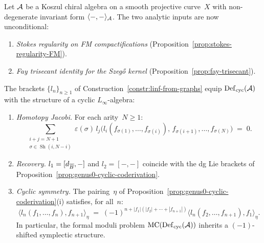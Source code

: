 \begin{theorem}\label{thm:cyclic-linf-graph}
Let $\mathcal{A}$ be a Koszul chiral algebra on a smooth projective
curve~$X$ with non-degenerate invariant form
$\langle{-},{-}\rangle_{\mathcal{A}}$.
The two analytic inputs are now unconditional:
\begin{enumerate}[label=\textup{(H\arabic*)}]
\item\label{hyp:stokes-FM}
  \emph{Stokes regularity on FM compactifications}
  \textup{(}Proposition~\textup{\ref{prop:stokes-regularity-FM}}\textup{)}.
\item\label{hyp:fay-propagator}
  \emph{Fay trisecant identity for the Szeg\H{o} kernel}
  \textup{(}Proposition~\textup{\ref{prop:fay-trisecant}}\textup{)}.
\end{enumerate}
The brackets $\{l_n\}_{n \geq 1}$ of
Construction~\textup{\ref{constr:linf-from-graphs}} equip
$\operatorname{Def}_{\mathrm{cyc}}(\mathcal{A})$ with the structure of a cyclic $L_\infty$-algebra:
\begin{enumerate}[label=\textup{(\alph*)}]
\item \emph{Homotopy Jacobi.}
  For each arity~$N \geq 1$:
  \begin{equation}\label{eq:homotopy-jacobi-graph}
  \sum_{\substack{i + j = N + 1 \\
  \sigma \in \operatorname{Sh}(i,N-i)}}
  \varepsilon(\sigma)\,
  l_j\bigl(l_i(f_{\sigma(1)}, \ldots, f_{\sigma(i)}),\,
  f_{\sigma(i+1)}, \ldots, f_{\sigma(N)}\bigr) \;=\; 0.
  \end{equation}
\item \emph{Recovery.}
  $l_1 = [d_{\overline{B}}, -]$ and
  $l_2 = [-,-]$ coincide with the dg Lie brackets of
  Proposition~\textup{\ref{prop:genus0-cyclic-coderivation}}.
\item \emph{Cyclic symmetry.}
  The pairing~$\eta$ of
  Proposition~\textup{\ref{prop:genus0-cyclic-coderivation}(i)}
  satisfies, for all~$n$:
  \begin{equation}\label{eq:cyclic-symmetry-graph}
  \langle l_n(f_1, \ldots, f_n), f_{n+1}\rangle_\eta
  \;=\;
  (-1)^{n + |f_1|(|f_2|+\cdots+|f_{n+1}|)}
  \langle l_n(f_2, \ldots, f_{n+1}), f_1\rangle_\eta.
  \end{equation}
  In particular, the formal moduli problem
  $\operatorname{MC}(\operatorname{Def}_{\mathrm{cyc}}(\mathcal{A}))$ inherits a $(-1)$-shifted
  symplectic structure.
\end{enumerate}
\end{theorem}

